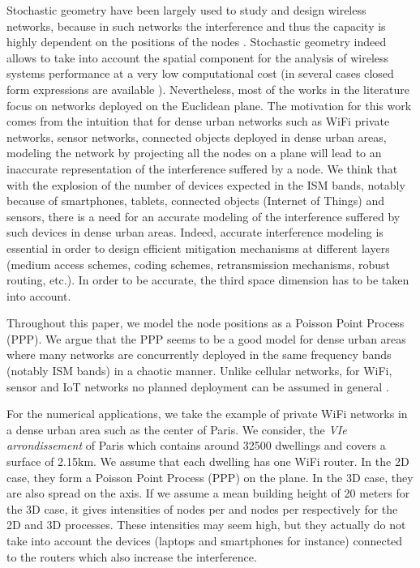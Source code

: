 \documentclass{sig-alternate-05-2015}
\begin{document}
Stochastic geometry have been largely used to study and design wireless networks, because in such networks the interference and thus the capacity is highly dependent on the positions of the nodes \cite{baccelli09,haenggi09}. Stochastic geometry indeed allows to take into account the spatial component for the analysis of wireless systems performance at a very low computational cost (in several cases closed form expressions are available \cite{baccelli09}). Nevertheless, most of the works in the literature focus on networks deployed on the Euclidean plane. The motivation for this work comes from the intuition that for dense urban networks such as WiFi private networks, sensor networks, connected objects  deployed in dense urban areas, modeling the network by projecting all the nodes on a plane will lead to an inaccurate representation of the interference suffered by a node. We think that with the explosion of the number of devices expected in the ISM bands, notably because of smartphones, tablets, connected objects (Internet of Things) and sensors, there is a need for an accurate modeling of the interference suffered by such devices in dense urban areas. Indeed, accurate interference modeling is essential in order to design efficient mitigation mechanisms at different layers (medium access schemes, coding schemes, retransmission mechanisms, robust routing, etc.). In order to be accurate, the third space dimension has to be taken into account.

Throughout this paper, we model the node positions as a Poisson Point Process (PPP). We argue that the PPP seems to be a good model for dense urban areas where many networks are concurrently deployed in the same frequency bands (notably ISM bands) in a chaotic manner. Unlike cellular networks, for WiFi, sensor and IoT networks no planned deployment can be assumed in general \cite{akella07}.

For the numerical applications, we take the example of private WiFi networks in a dense urban area such as the center of Paris. We consider, the \emph{VIe arrondissement} of Paris which contains around 32500 dwellings \cite{paris} and covers a surface of 2.15km. We assume that each dwelling has one WiFi router. In the 2D case, they form a Poisson Point Process (PPP) on the plane. In the 3D case, they are also spread on the  axis. If we assume a mean building height of 20 meters for the 3D case, it gives intensities of  nodes per  and  nodes per  respectively for the 2D and 3D processes. These intensities may seem high, but they actually do not take into account the devices (laptops and smartphones for instance) connected to the routers which also increase the interference.
\end{document}
